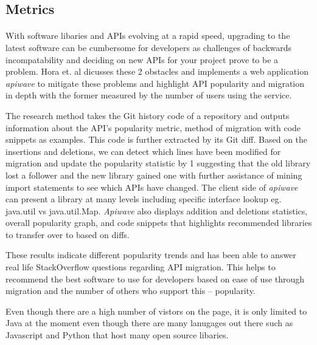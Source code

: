 \documentclass[12pt]{article}
\begin{document}


\subsection{Metrics}
\paragraph{}
With software libaries and APIs evolving at a rapid speed, upgrading to the latest software can be cumbersome for developers
as challenges of backwards incompatability and deciding on new APIs for your project prove to be a problem.
Hora et. al \cite{apiwave} dicusses these 2 obstacles and implements a web application \textit{apiwave} \cite{apiwavewebsite} to mitigate these problems and
highlight API popularity and migration in depth with the former measured by the number of users using the service.

The research method takes the Git history code of a repository and outputs information about the API's popularity metric, method of migration with code snippets as examples.
This code is further extracted by its Git diff. Based on the insertions and deletions, we can detect which lines have been modified for migration 
and update the popularity statistic by 1 suggesting that the old library lost a follower and the new library gained one with further 
assistance of mining import statements to see which APIs have changed.
The client side of \textit{apiwave} \cite{apiwavewebsite} can present a library at many levels including specific interface lookup eg. java.util vs java.util.Map.
\textit{Apiwave} also displays addition and deletions statistics, overall popularity graph, 
and code snippets that highlights recommended libraries to transfer over to based on diffs.

These results indicate different popularity trends and has been able to answer real life StackOverflow \cite{stackoverflow} 
questions regarding API migration. This helps to recommend the best software to use for developers based on ease of use through migration
and the number of others who support this -- popularity.

Even though there are a high number of vistors on the page, it is only limited to Java at the moment even though there are many lanugages out there
such as Javascript and Python that host many open source libaries. 
\end{document}
